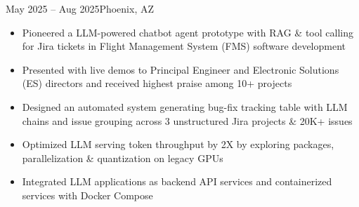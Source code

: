     {}
    {May 2025 -- Aug 2025}{Phoenix, AZ}{}
\begin{itemize}
    \item Pioneered a LLM-powered chatbot agent prototype with RAG \& tool calling
    for Jira tickets in Flight Management System (FMS) software development
    \item Presented with live demos to Principal Engineer and Electronic Solutions (ES) directors 
    and received highest praise among 10+ projects
    \item Designed an automated system generating bug-fix tracking table with LLM chains and issue grouping across 3 unstructured Jira projects \& 20K+ issues
    \item Optimized LLM serving token throughput by 2X by exploring packages, parallelization \& quantization on legacy GPUs
    \item Integrated LLM applications as backend API services and containerized services with Docker Compose
    
\end{itemize}
\dividerSmall


